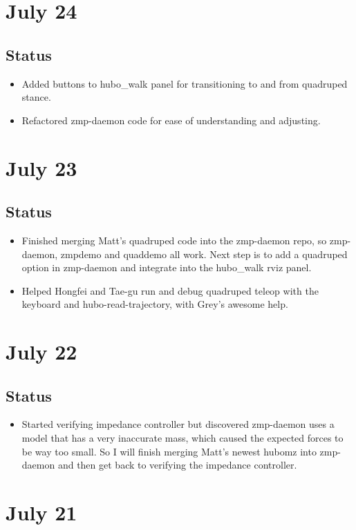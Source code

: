 \documentclass[letterpaper, 10 pt]{report}
\begin{document}
\section*{July 24}
\subsection*{Status}
\begin{itemize}
\item Added buttons to hubo\_walk panel for transitioning to and from quadruped stance.
\item Refactored zmp-daemon code for ease of understanding and adjusting.
\end{itemize}

\section*{July 23}
\subsection*{Status}
\begin{itemize}
\item Finished merging Matt's quadruped code into the zmp-daemon repo, so zmp-daemon, zmpdemo and quaddemo all work. Next step is to add a quadruped option in zmp-daemon and integrate into the hubo\_walk rviz panel.
\item Helped Hongfei and Tae-gu run and debug quadruped teleop with the keyboard and hubo-read-trajectory, with Grey's awesome help.
\end{itemize}

\section*{July 22}
\subsection*{Status}
\begin{itemize}
\item Started verifying impedance controller but discovered zmp-daemon uses a model that has a very inaccurate mass, which caused the expected forces to be way too small. So I will finish merging Matt's newest hubomz into zmp-daemon and then get back to verifying the impedance controller.
\end{itemize}

\section*{July 21}
\end{document}
